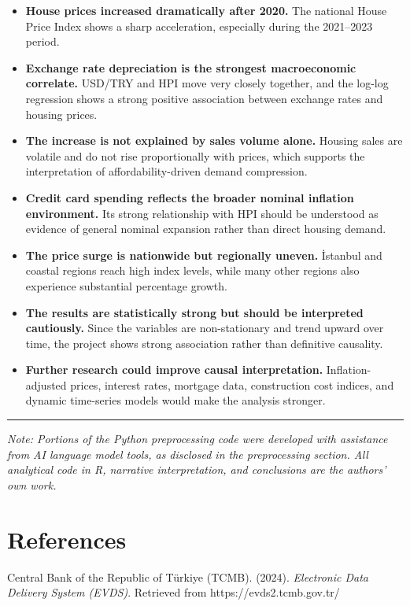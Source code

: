 \documentclass[
  11pt,
  a4paper,
]{article}
\begin{document}
\begin{itemize}
\item
  \textbf{House prices increased dramatically after 2020.} The national
  House Price Index shows a sharp acceleration, especially during the
  2021--2023 period.
\item
  \textbf{Exchange rate depreciation is the strongest macroeconomic
  correlate.} USD/TRY and HPI move very closely together, and the
  log-log regression shows a strong positive association between
  exchange rates and housing prices.
\item
  \textbf{The increase is not explained by sales volume alone.} Housing
  sales are volatile and do not rise proportionally with prices, which
  supports the interpretation of affordability-driven demand
  compression.
\item
  \textbf{Credit card spending reflects the broader nominal inflation
  environment.} Its strong relationship with HPI should be understood as
  evidence of general nominal expansion rather than direct housing
  demand.
\item
  \textbf{The price surge is nationwide but regionally uneven.} İstanbul
  and coastal regions reach high index levels, while many other regions
  also experience substantial percentage growth.
\item
  \textbf{The results are statistically strong but should be interpreted
  cautiously.} Since the variables are non-stationary and trend upward
  over time, the project shows strong association rather than definitive
  causality.
\item
  \textbf{Further research could improve causal interpretation.}
  Inflation-adjusted prices, interest rates, mortgage data, construction
  cost indices, and dynamic time-series models would make the analysis
  stronger.
\end{itemize}

\begin{center}\rule{0.5\linewidth}{0.5pt}\end{center}

\emph{Note: Portions of the Python preprocessing code were developed
with assistance from AI language model tools, as disclosed in the
preprocessing section. All analytical code in R, narrative
interpretation, and conclusions are the authors' own work.}

\section{References}\label{references}

Central Bank of the Republic of Türkiye (TCMB). (2024). \emph{Electronic
Data Delivery System (EVDS)}. Retrieved from https://evds2.tcmb.gov.tr/
\end{document}
